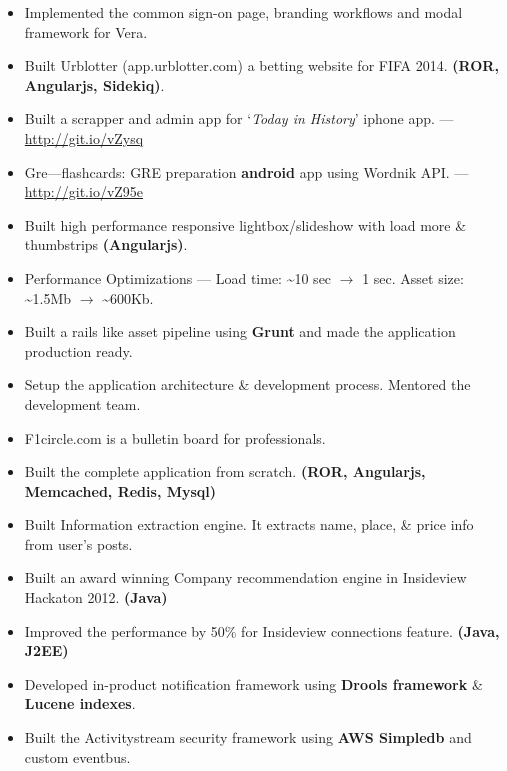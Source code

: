 \documentclass{resume}
\begin{document}
\begin{itemize} \itemsep1pt \parskip0pt
  \item Implemented the common sign-on page, branding workflows and modal framework for Vera.
  \item Built Urblotter (app.urblotter.com) a betting website for FIFA 2014. \textbf{(ROR, Angularjs, Sidekiq)}.
  \item Built a scrapper and admin app for `\textit{Today in History}' iphone app. --- \url{http://git.io/vZysq}
  \item Gre---flashcards: GRE preparation \textbf{android} app using Wordnik API\@. --- \url{http://git.io/vZ95e}
\end{itemize}
\begin{itemize} \itemsep1pt \parskip0pt
  \item Built high performance responsive lightbox/slideshow with load more \& thumbstrips \textbf{(Angularjs)}.
  \item Performance Optimizations --- Load time: \textasciitilde10 sec \( \rightarrow \) 1 sec.  
    Asset size: \textasciitilde1.5Mb \( \rightarrow \) \textasciitilde600Kb.
  \item Built a rails like asset pipeline using \textbf{Grunt} and made the application production ready.
  \item Setup the application architecture \& development process. Mentored the development team.
\end{itemize}
\begin{itemize} \itemsep1pt \parskip0pt
  \item F1circle.com is a bulletin board for professionals.
  \item Built the complete application from scratch. \textbf{(ROR, Angularjs, Memcached, Redis, Mysql)}
  \item Built Information extraction engine. It extracts name, place, \& price info from user's posts.
\end{itemize}
\begin{itemize} \itemsep1pt \parskip0pt
  \item Built an award winning Company recommendation engine in Insideview Hackaton 2012. \textbf{(Java)}
  \item Improved the performance by 50\% for Insideview connections feature. \textbf{(Java, J2EE)}
  \item Developed in-product notification framework using \textbf{Drools framework} \& \textbf{Lucene indexes}.
  \item Built the Activitystream security framework using \textbf{AWS Simpledb} and custom eventbus.
\end{itemize}
\end{document}
